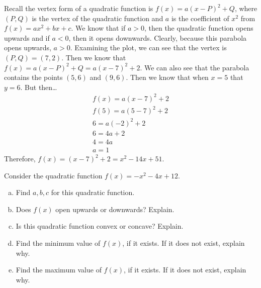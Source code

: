 \documentclass[11pt,letterpaper]{article}
\begin{document}
\sol Recall the vertex form of a quadratic function is $f(x)= a(x - P)^2 + Q$, where $(P, Q)$ is the vertex of the quadratic function and $a$ is the coefficient of $x^2$ from $f(x)= ax^2 + bx + c$. We know that if $a > 0$, then the quadratic function opens upwards and if $a < 0$, then it opens downwards. Clearly, because this parabola opens upwards, $a > 0$. Examining the plot, we can see that the vertex is $(P, Q)= (7, 2)$. Then we know that $f(x)= a(x - P)^2 + Q= a(x - 7)^2 + 2$. We can also see that the parabola contains the points $(5, 6)$ and $(9, 6)$. Then we know that when $x= 5$ that $y= 6$. But then\dots
	\[
	\begin{gathered}
	f(x)= a(x - 7)^2 + 2 \\
	f(5)= a(5 - 7)^2 + 2 \\
	6= a(-2)^2 + 2 \\
	6= 4a + 2 \\
	4= 4a \\
	a= 1
	\end{gathered}
	\] \pspace
Therefore, $f(x)= (x - 7)^2 + 2= x^2 - 14x + 51$. 



\newpage



 Consider the quadratic function $f(x)= -x^2 - 4x + 12$.
	\begin{enumerate}[(a)]
	\item Find $a, b, c$ for this quadratic function.
	\item Does $f(x)$ open upwards or downwards? Explain.
	\item Is this quadratic function convex or concave? Explain. 
	\item Find the minimum value of $f(x)$, if it exists. If it does not exist, explain why.  
	\item Find the maximum value of $f(x)$, if it exists. If it does not exist, explain why. 
	\end{enumerate} \pspace
\end{document}
